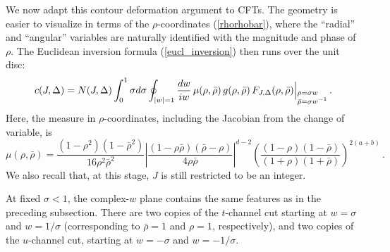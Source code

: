 \documentclass[11pt, reqno,preprint]{article}
\def\be{\begin{equation}}
\def\ee{\end{equation}}
\def\rhobar{\bar{\rho}}
\def\j{J}
\def\c{c}
\begin{document}
We now adapt this contour deformation argument to CFTs.
The geometry is easier to visualize in terms of the $\rho$-coordinates (\ref{rhorhobar}),
where the ``radial'' and ``angular'' variables are naturally identified with the magnitude and phase of $\rho$.
The Euclidean inversion formula (\ref{eucl_inversion}) then runs over the unit disc:
\be
  \c(\j,\Delta) = N(\j,\Delta) \int_0^1 \sigma d\sigma \oint_{|w|=1} \frac{dw}{i w} \,\mu(\rho,\rhobar)\, g(\rho,\rhobar)\, F_{\j,\Delta}(\rho,\rhobar)
  \Big|_{\begin{subarray}{l}\rho=\sigma w \\ \rhobar=\sigma w^{-1}\end{subarray}}
  \,. \label{eucl_inversion_rho}
\ee
Here, the measure in $\rho$-coordinates, including the Jacobian from the change of variable, is
\be
\mu(\rho,\rhobar)=\frac{(1-\rho^2)(1-\rhobar^2)}{16\rho^2\rhobar^2}
\left|\frac{(1-\rho\rhobar)(\rhobar-\rho)}{4\rho\rhobar}\right|^{d-2}\left(\frac{(1-\rho)(1-\rhobar)}{(1+\rho)(1+\rhobar)}\right)^{2(a+b)}\,. \label{measrho}
\ee
We also recall that, at this stage, $\j$ is still restricted to be an integer.

At fixed $\sigma<1$, the complex-$w$ plane contains the same features as in the preceding subsection.
There are two copies of the $t$-channel cut starting at $w=\sigma$ and $w=1/\sigma$ (corresponding to $\rhobar=1$ and $\rho=1$, respectively),
and two copies of the $u$-channel cut, starting at $w=-\sigma$ and $w=-1/\sigma$.
\end{document}
